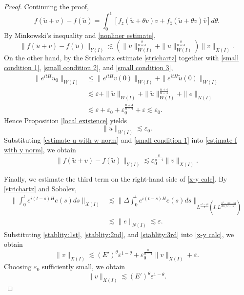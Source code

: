 \documentclass[11pt,a4paper]{article}
\numberwithin{equation}{section}
\begin{document}
\begin{proof}
Continuing the proof,
\[
 f(\tilde{u} + v) - f(\tilde{u}) = \int_{0}^{1}[f_{z}(\tilde{u} + \theta v)v + f_{\bar{z}}(\tilde{u} + \theta v)\bar{v}]d\theta.
\]
By Minkowski's inequality and \eqref{nonliner estimate},
\begin{equation}\label{estimate f with y norm}
\|f(\tilde{u} + v) - f(\tilde{u})\|_{Y(I)} \lesssim (\|\tilde{u}\|^{\frac{8}{n - 4}}_{W(I)} + \|u\|^{\frac{8}{n - 4}}_{W(I)} )\|v\|_{X(I)}.
\end{equation}
On the other hand, by the Strichartz estimate \eqref{strichartz} together with \eqref{small condition 1}, \eqref{small condition 2}, and \eqref{small condition 3},
\begin{align*}
\|e^{itH}u_{0}\|_{W(I)}
&\leq \|e^{itH}v(0)\|_{W(I)} + \|e^{itH}\tilde{u}(0) \|_{W(I)} \\
&\lesssim \varepsilon + \|\tilde{u}\|_{W(I)} + \|\tilde{u}\|_{W(I)}^{\frac{n + 4}{n - 4}} + \|e\|_{N(I)} \\
&\lesssim \varepsilon + \varepsilon_{0} + \varepsilon_{0}^{\frac{n + 4}{n - 4}} + \varepsilon \lesssim \varepsilon_{0}.
\end{align*}
Hence Proposition \ref{local existence} yields
\begin{equation}\label{estimate u with w norm}
\|u\|_{W(I)} \lesssim \varepsilon_{0}.
\end{equation}
Substituting \eqref{estimate u with w norm} and \eqref{small condition 1} into \eqref{estimate f with y norm}, we obtain
\begin{equation}\label{stablity:2nd}
\|f(\tilde{u} + v) - f(\tilde{u})\|_{Y(I)} \lesssim \varepsilon_{0}^{\frac{8}{n - 4}}\|v\|_{X(I)}.
\end{equation}

Finally, we estimate the third term on the right-hand side of \eqref{x-y calc}. By \eqref{strichartz} and Sobolev,
\begin{equation}\label{stablity:3rd}
\begin{aligned}
\|\int_{0}^{t}e^{i(t - s)H}e(s) ds \|_{X(I)}
&\lesssim \|\Delta \int_{0}^{t}e^{i(t - s)H}e(s) ds \|_{L^{\frac{n^{2} - 16}{8}}(I, L^{\frac{n^{3} - 16n -64}{2n(n^{2}-16)}})} \\
&\lesssim \|e\|_{N(I)} \lesssim \varepsilon.
\end{aligned}
\end{equation}
Substituting \eqref{stablity:1st}, \eqref{stablity:2nd}, and \eqref{stablity:3rd} into \eqref{x-y calc}, we obtain
\[
\|v\|_{X(I)} \lesssim (E')^{\theta}\varepsilon^{1 - \theta} + \varepsilon_{0}^{\frac{8}{n - 4}}\|v\|_{X(I)} + \varepsilon.
\]
Choosing $\varepsilon_{0}$ sufficiently small, we obtain
\begin{equation}\label{estimate v with x}
\|v\|_{X(I)} \lesssim (E')^{\theta}\varepsilon^{1 - \theta}.
\end{equation}


\end{proof}
\end{document}
